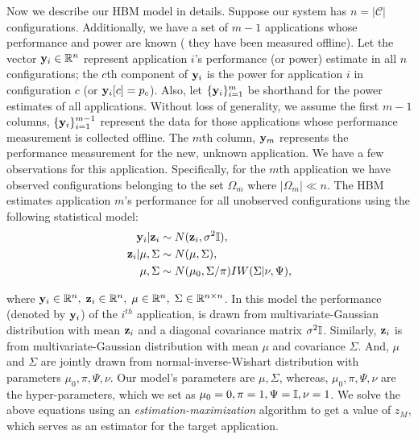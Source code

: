 Now we describe our HBM model in details. Suppose our system has $n = |\mathcal{C}|$ configurations.    Additionally, we have a set of $m-1$
applications whose performance and power are known (\ie{} they have
been measured offline). Let the vector $\mathbf{y}_i \in \mathbb{R}^{n}$ represent
application $i$'s performance (or power) estimate in all $n$
configurations; \ie{} the $c$th component of $\mathbf{y}_i$ is the power for
application $i$ in configuration $c$ (or $\mathbf{y}_i[c] = p_c$).  Also, let
$\{\mathbf{y}_i\}_{i =1}^m$ be shorthand for the power estimates of all
applications.  Without loss of generality, we assume the first $m-1$
columns, \ie{} $\{\mathbf{y}_i\}_{i =1}^{m-1}$ represent the data for those
applications whose performance measurement is collected offline.  The $m$th
column, $\mathbf{y}_m$ represents the performance measurement for the new, unknown
application.  We have a few observations for this application.
Specifically, for the $m$th application we have observed
configurations belonging to the set $\Omega_m$ where $|\Omega_m| \ll
n$.  The HBM estimates application $m$'s performance for all unobserved
configurations using the following statistical model:
\begin{equation}
\begin{aligned}
\mathbf{y}_i \vert \mathbf{z}_i  &\sim N( \mathbf{z}_i, \sigma^2 \mathbb{I}),\\
\mathbf{z}_i \vert \mu,\Sigma &\sim N(\mu, \Sigma),\\
\mu, \Sigma &\sim N(\mu_0,\Sigma / \pi)IW(\Sigma | \nu, \Psi),
\end{aligned}
\label{eq:HBN}
\end{equation}

where $\mathbf{y}_i \in \mathbb{R}^n, \; \mathbf{z}_i \in \mathbb{R}^n, \; \mu \in \mathbb{R}^{n}, \; \Sigma
\in \mathbb{R}^{n\times n}$. In this model the performance (denoted by $\mathbf{y}_i$) of
the $i^{th}$ application, is drawn from multivariate-Gaussian
distribution with mean $\mathbf{z}_i$ and a diagonal covariance matrix
$\sigma^2\mathbb{I}$.  Similarly, $\mathbf{z}_i$ is from multi\-variate-Gaussian
distribution with mean $\mu$ and covariance $\Sigma$. And, $\mu$ and
$\Sigma$ are jointly drawn from normal-inverse-Wishart distribution
with parameters $\mu_0, \pi,\Psi, \nu$.  Our model's parameters are
$\mu,\Sigma$, whereas, $\mu_0, \pi,\Psi, \nu$ are the
hyper-para\-meters, which we set as $\mu_0 = 0, \pi = 1,\Psi = \mathbb{I}, \nu =
1$.  We solve the above equations using an
\emph{estimation-maximization} algorithm to get a value of $z_M$,
which serves as an estimator for the target application.




